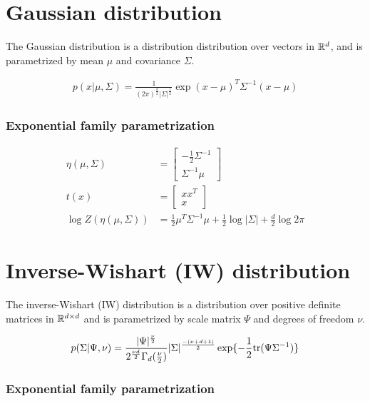\section{Gaussian distribution}
\label{sec:stats-gaussian}

The Gaussian distribution is a distribution
distribution over vectors in $\mathbb{R}^d$,
and is parametrized by mean $\mu$ and covariance $\Sigma$.

\begin{align}
        p(x | \mu, \Sigma) = \frac{1}{(2\pi)^{\frac{d}{2}}|\Sigma|^{\frac{1}{2}}} \exp{(x - \mu)^T\Sigma^{-1}(x - \mu)}
\end{align}

\subsubsection*{Exponential family parametrization}

\begin{align*}
    \eta(\mu, \Sigma) &= \begin{bmatrix}-\frac{1}{2}\Sigma^{-1} \\ \Sigma^{-1}\mu\end{bmatrix} \\
    t(x) &= \begin{bmatrix}xx^T \\ x\end{bmatrix} \\
    \log Z(\eta(\mu, \Sigma)) &= \frac{1}{2}\mu^T\Sigma^{-1}\mu + \frac{1}{2}\log |\Sigma| + \frac{d}{2}\log 2\pi
\end{align*}

\section{Inverse-Wishart (IW) distribution}
\label{sec:stats-iw}

The inverse-Wishart (IW) distribution is a
distribution over positive definite matrices in $\mathbb{R}^{d \times d}$
and is parametrized by scale matrix $\Psi$ and degrees of freedom $\nu$.

\begin{align}
        p(\Sigma | \Psi, \nu) = \frac{|\Psi|^{\frac{\nu}{2}}}{2^{\frac{\nu d}{2}}\Gamma_d(\frac{\nu}{2})}|\Sigma|^{\frac{-(\nu + d + 1)}{2}} \exp{-\frac{1}{2}\tr(\Psi\Sigma^{-1})}
\end{align}

\subsubsection*{Exponential family parametrization}

